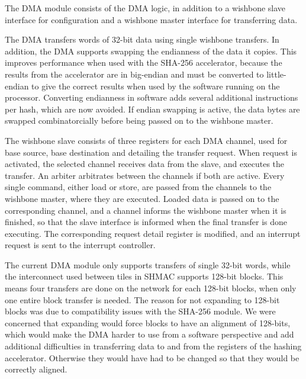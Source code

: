 The DMA module consists of the DMA logic, in addition to a wishbone slave interface for configuration
and a wishbone master interface for transferring data.

The DMA transfers words of 32-bit data using single wishbone transfers.  In addition, the DMA supports
swapping the endianness of the data it copies. This improves performance when used with the SHA-256
accelerator, because the results from the accelerator are in big-endian
and must be converted to little-endian to give the correct results when used by the software running on the processor.
Converting endianness in software adds several additional instructions per hash, which are now avoided.
If endian swapping is active, the data bytes are swapped combinatorcially before being passed on to the wishbone master.

The wishbone slave consists of three registers for each DMA channel, used for base source, base destination and detailing the transfer request.
When request is activated, the selected channel receives data from the slave, and executes the transfer.
An arbiter arbitrates between the channels if both are active.
Every single command, either load or store, are passed from the channels to the wishbone master, where they are executed.
Loaded data is passed on to the corresponding channel, and a channel informs the wishbone master when it is finished, so that the slave interface is informed when the final transfer is done executing.
The corresponding request detail register is modified, and an interrupt request is sent to the interrupt controller.

The current DMA module only supports transfers of single 32-bit words, while the interconnect used between tiles in SHMAC supports 128-bit blocks.
This means four transfers are done on the network for each 128-bit blocks, when only one entire block transfer is needed. 
The reason for not expanding to 128-bit blocks was due to compatibility issues with the SHA-256 module. 
We were concerned that expanding would force blocks to have an alignment of 128-bits, which would make the DMA harder to use from a software perspective and add additional difficulties in transferring data to and from the registers of the hashing accelerator. 
Otherwise they would have had to be changed so that they would be correctly aligned.

